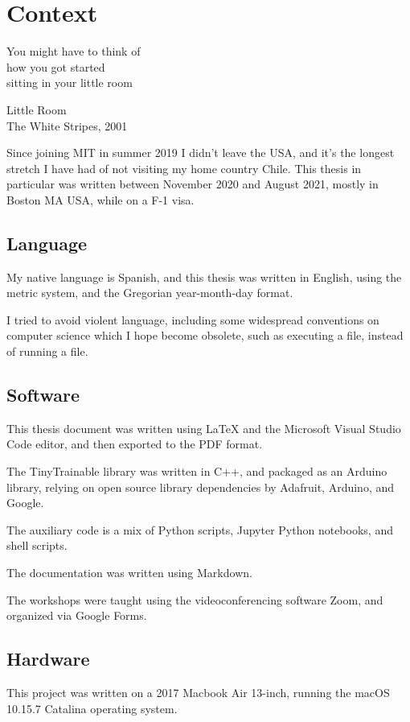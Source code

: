\chapter{Context}

\epigraph{You might have to think  of \\ how you got started \\ sitting in your little room}{Little Room \\ The White Stripes, 2001}

Since joining MIT in summer 2019 I didn't leave the USA, and it's the longest stretch I have had of not visiting my home country Chile. This thesis in particular was written between November 2020 and August 2021, mostly in Boston MA USA, while on a F-1 visa.

\section{Language}

My native language is Spanish, and this thesis was written in English, using the metric system, and the Gregorian year-month-day format.

I tried to avoid violent language, including some widespread conventions on computer science which I hope become obsolete, such as executing a file, instead of running a file.

\section{Software}

This thesis document was written using LaTeX and the Microsoft Visual Studio Code editor, and then exported to the PDF format.

The TinyTrainable library was written in C++, and packaged as an Arduino library, relying on open source library dependencies by Adafruit, Arduino, and Google.

The auxiliary code is a mix of Python scripts, Jupyter Python notebooks, and shell scripts.

The documentation was written using Markdown.

The workshops were taught using the videoconferencing software Zoom, and organized via Google Forms.

\section{Hardware}

This project was written on a 2017 Macbook Air 13-inch, running the macOS 10.15.7 Catalina operating system.


